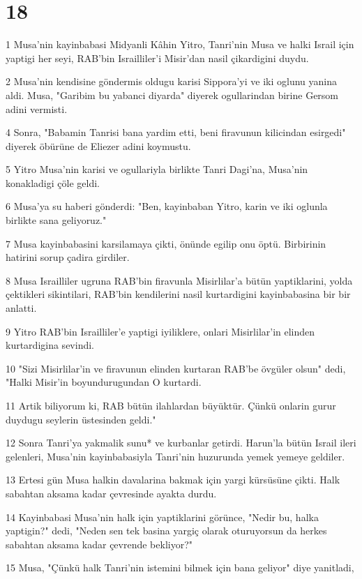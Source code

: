 \chapter{18}

\par 1 Musa'nin kayinbabasi Midyanli Kâhin Yitro, Tanri'nin Musa ve halki Israil için yaptigi her seyi, RAB'bin Israilliler'i Misir'dan nasil çikardigini duydu.
\par 2 Musa'nin kendisine göndermis oldugu karisi Sippora'yi ve iki oglunu yanina aldi. Musa, "Garibim bu yabanci diyarda" diyerek ogullarindan birine Gersom adini vermisti.
\par 4 Sonra, "Babamin Tanrisi bana yardim etti, beni firavunun kilicindan esirgedi" diyerek öbürüne de Eliezer adini koymustu.
\par 5 Yitro Musa'nin karisi ve ogullariyla birlikte Tanri Dagi'na, Musa'nin konakladigi çöle geldi.
\par 6 Musa'ya su haberi gönderdi: "Ben, kayinbaban Yitro, karin ve iki oglunla birlikte sana geliyoruz."
\par 7 Musa kayinbabasini karsilamaya çikti, önünde egilip onu öptü. Birbirinin hatirini sorup çadira girdiler.
\par 8 Musa Israilliler ugruna RAB'bin firavunla Misirlilar'a bütün yaptiklarini, yolda çektikleri sikintilari, RAB'bin kendilerini nasil kurtardigini kayinbabasina bir bir anlatti.
\par 9 Yitro RAB'bin Israilliler'e yaptigi iyiliklere, onlari Misirlilar'in elinden kurtardigina sevindi.
\par 10 "Sizi Misirlilar'in ve firavunun elinden kurtaran RAB'be övgüler olsun" dedi, "Halki Misir'in boyundurugundan O kurtardi.
\par 11 Artik biliyorum ki, RAB bütün ilahlardan büyüktür. Çünkü onlarin gurur duydugu seylerin üstesinden geldi."
\par 12 Sonra Tanri'ya yakmalik sunu* ve kurbanlar getirdi. Harun'la bütün Israil ileri gelenleri, Musa'nin kayinbabasiyla Tanri'nin huzurunda yemek yemeye geldiler.
\par 13 Ertesi gün Musa halkin davalarina bakmak için yargi kürsüsüne çikti. Halk sabahtan aksama kadar çevresinde ayakta durdu.
\par 14 Kayinbabasi Musa'nin halk için yaptiklarini görünce, "Nedir bu, halka yaptigin?" dedi, "Neden sen tek basina yargiç olarak oturuyorsun da herkes sabahtan aksama kadar çevrende bekliyor?"
\par 15 Musa, "Çünkü halk Tanri'nin istemini bilmek için bana geliyor" diye yanitladi,
